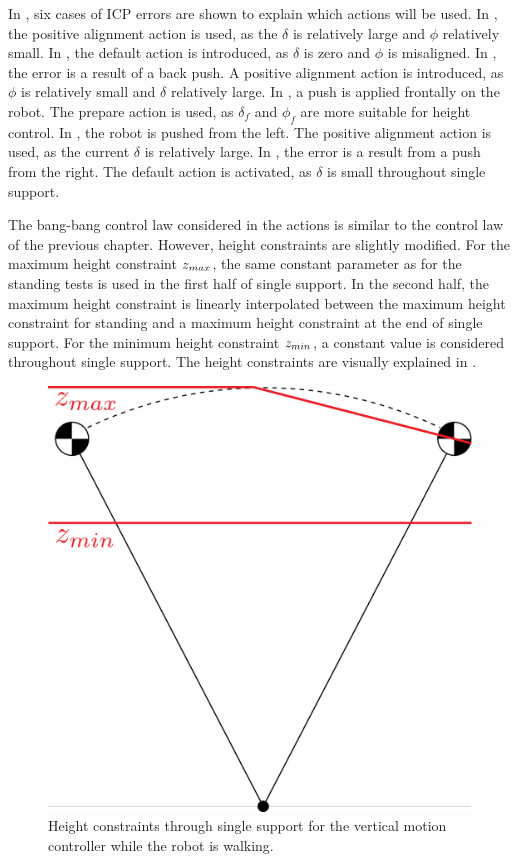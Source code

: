In , six cases of \ac{ICP} errors are shown to explain which actions will be used. In , the positive alignment action is used, as the $\delta$ is relatively large and $\phi$ relatively small. In , the default action is introduced, as $\delta$ is zero and $\phi$ is misaligned. In , the error is a result of a back push. A positive alignment action is introduced, as $\phi$ is relatively small and $\delta$ relatively large. In , a push is applied frontally on the robot. The prepare action is used, as $\delta_f$ and $\phi_f$ are more suitable for height control. In , the robot is pushed from the left. The positive alignment action is used, as the current $\delta$ is relatively large. In , the error is a result from a push from the right. The default action is activated, as $\delta$ is small throughout single support.

The bang-bang control law considered in the actions is similar to the control law of the previous chapter. However, height constraints are slightly modified. For the maximum height constraint $z_{max}$, the same constant parameter as for the standing tests is used in the first half of single support. In the second half, the maximum height constraint is linearly interpolated between the maximum height constraint for standing and a maximum height constraint at the end of single support.  For the minimum height constraint $z_{min}$, a constant value is considered throughout single support. The height constraints are visually explained in .
\begin{figure}
\centering
  \includegraphics[width=.4\linewidth]{STYLESTUFF/heightconstraints.png}
   \caption{Height constraints through single support for the vertical motion controller while the robot is walking.}
    \label{fig:heightconstraints}
\end{figure} 
